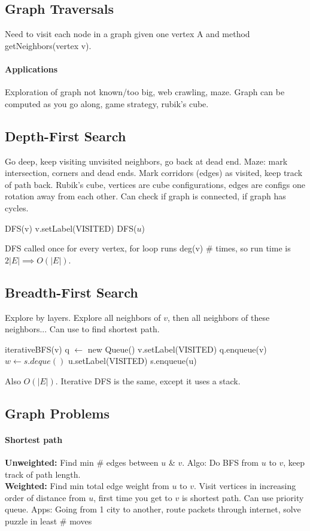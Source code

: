 \subsection{Graph Traversals}
Need to visit each node in a graph given one vertex A and method getNeighbors(vertex v).
\vspace{-7 pt}
\paragraph{Applications}Exploration of graph not known/too big, web crawling, maze. Graph can be computed as you go along, game strategy, rubik's cube.
\subsection{Depth-First Search} Go deep, keep visiting unvisited neighbors, go back at dead end. Maze: mark intersection, corners and dead ends. Mark corridors (edges) as visited, keep track of path back. Rubik's cube, vertices are cube configurations, edges are configs one rotation away from each other. Can check if graph is connected, if graph has cycles.
\begin{algorithmic}
  \State DFS(v)
  \State v.setLabel(VISITED)
  \State DFS($u$)
  \EndIf
  \EndFor
\end{algorithmic}
DFS called once for every vertex, for loop runs deg(v) \# times, so run time is $2|E| \implies O(|E|)$.
\subsection{Breadth-First Search} Explore by layers. Explore all neighbors of $v$, then all neighbors of these neighbors... Can use to find shortest path.
\begin{algorithmic}
  \State iterativeBFS(v)
  \State q $\gets$ new Queue()
  \State v.setLabel(VISITED)
  \State q.enqueue(v)
  \State $w \gets s.deque()$
  \State u.setLabel(VISITED)
  \State s.enqueue(u)
  \EndIf
  \EndFor
  \EndWhile
\end{algorithmic}
Also $O(|E|)$. Iterative DFS is the same, except it uses a stack.
\subsection{Graph Problems}
\paragraph{Shortest path} \textbf{Unweighted:} Find min \# edges between $u$ \& $v$. Algo: Do BFS from $u$ to $v$, keep track of path length. \\ \textbf{Weighted:} Find min total edge weight from $u$ to $v$. Visit vertices in increasing order of distance from $u$, first time you get to $v$ is shortest path. Can use priority queue. Apps: Going from 1 city to another, route packets through internet, solve puzzle in least \# moves
\vspace{-7 pt}
